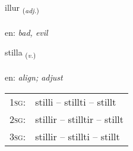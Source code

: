 \documentclass[frontgrid, backgrid]{flacards}\usepackage[]{graphicx}\usepackage[]{color}
\begin{document}
\renewcommand{\flhead}{\vskip5pt \fboxsep=0pt {\small\bfseries\footnotesize Lýsingarorð | Adjective}}
\renewcommand{\fcfoot}{\vskip5pt \fboxsep=0pt \hspace{2pt}{\small\bfseries\footnotesize 2K}}

\renewcommand{\blhead}{\vskip5pt {\small\bfseries\footnotesize Lýsingarorð | Adjective }}
\renewcommand{\bcfoot}{\vskip5pt \hspace{2pt}{\small\bfseries\footnotesize 2K}}


{illur \small{\textsubscript{(\textit{adj.})}} \\[1ex] %
\textphonetic{[ɪtlʏr]} \\
en: \emph{bad, evil} \\  [2ex]
\renewcommand*{\arraystretch}{0.8}
}

\renewcommand{\flhead}{\vskip5pt \fboxsep=0pt {\small\bfseries\footnotesize Sagnorð | Verb}}
\renewcommand{\fcfoot}{\vskip5pt \fboxsep=0pt \hspace{2pt}{\small\bfseries\footnotesize 2K}}

\renewcommand{\blhead}{\vskip5pt {\small\bfseries\footnotesize Sagnorð | Verb }}
\renewcommand{\bcfoot}{\vskip5pt \hspace{2pt}{\small\bfseries\footnotesize 2K}}


{stilla \small{\textsubscript{(\textit{v.})}} \\[1ex] %
\textphonetic{[stɪtla]} \\
en: \emph{align; adjust} \\  [2ex]
\renewcommand*{\arraystretch}{0.8}
\begin{tabular}{p{1cm}l}
\textsc{1sg}: & stilli -- stillti -- stillt \\ 
\textsc{2sg}: & stillir -- stilltir -- stillt \\ 
\textsc{3sg}: & stillir -- stillti -- stillt \\ 
\end{tabular}
}
\end{document}
